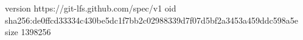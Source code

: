 version https://git-lfs.github.com/spec/v1
oid sha256:de0ffcd33334c430be5dc1f7bb2c02988339d7f07d5bf2a3453a459ddc598a5e
size 1398256
